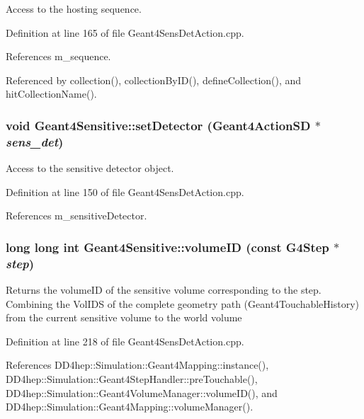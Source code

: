Access to the hosting sequence. 

Definition at line 165 of file Geant4SensDetAction.cpp.

References m\_\-sequence.

Referenced by collection(), collectionByID(), defineCollection(), and hitCollectionName().\hypertarget{class_d_d4hep_1_1_simulation_1_1_geant4_sensitive_aac4f3a911f3818516bfb54a5b2bbef39}{
\subsubsection[{setDetector}]{\setlength{\rightskip}{0pt plus 5cm}void Geant4Sensitive::setDetector ({\bf Geant4ActionSD} $\ast$ {\em sens\_\-det})}}
\label{class_d_d4hep_1_1_simulation_1_1_geant4_sensitive_aac4f3a911f3818516bfb54a5b2bbef39}


Access to the sensitive detector object. 

Definition at line 150 of file Geant4SensDetAction.cpp.

References m\_\-sensitiveDetector.\hypertarget{class_d_d4hep_1_1_simulation_1_1_geant4_sensitive_a9aa1270e3fb490a4ebe511343903d72f}{
\subsubsection[{volumeID}]{\setlength{\rightskip}{0pt plus 5cm}long long int Geant4Sensitive::volumeID (const G4Step $\ast$ {\em step})}}
\label{class_d_d4hep_1_1_simulation_1_1_geant4_sensitive_a9aa1270e3fb490a4ebe511343903d72f}


Returns the volumeID of the sensitive volume corresponding to the step. Combining the VolIDS of the complete geometry path (Geant4TouchableHistory) from the current sensitive volume to the world volume 

Definition at line 218 of file Geant4SensDetAction.cpp.

References DD4hep::Simulation::Geant4Mapping::instance(), DD4hep::Simulation::Geant4StepHandler::preTouchable(), DD4hep::Simulation::Geant4VolumeManager::volumeID(), and DD4hep::Simulation::Geant4Mapping::volumeManager().

